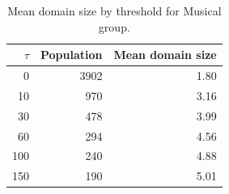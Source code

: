 \begin{table}[htbp]
\centering
\small
\begin{tabular}{r r r}
\hline
$\tau$ & Population & Mean domain size \\
\hline
0 & 3902 & 1.80 \\
10 & 970 & 3.16 \\
30 & 478 & 3.99 \\
60 & 294 & 4.56 \\
100 & 240 & 4.88 \\
150 & 190 & 5.01 \\
\hline
\end{tabular}
\caption{Mean domain size by threshold for Musical group.}
\label{tab:mean-size-Musical-group}
\end{table}
